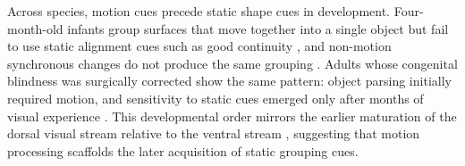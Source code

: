 \documentclass{ccn}  %
\begin{document}
Across species, motion cues precede static shape cues in development. Four-month-old infants group surfaces that move together into a single object but fail to use static alignment cues such as good continuity \citep{kellman1983perception}, and non-motion synchronous changes do not produce the same grouping \citep{jusczyk1999synchronous}. Adults whose congenital blindness was surgically corrected show the same pattern: object parsing initially required motion, and sensitivity to static cues emerged only after months of visual experience \citep{ostrovsky2009visual}. This developmental order mirrors the earlier maturation of the dorsal visual stream relative to the ventral stream \citep{ciesielski2019maturational}, suggesting that motion processing scaffolds the later acquisition of static grouping cues.

\end{document}
